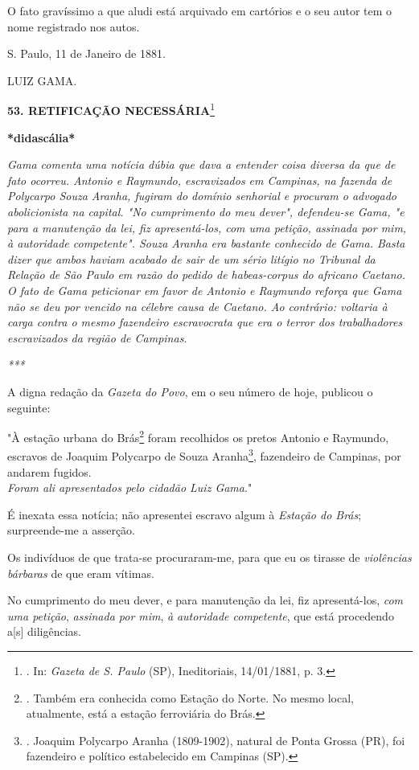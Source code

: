 O fato gravíssimo a que aludi está arquivado em cartórios e o seu autor
tem o nome registrado nos autos.

S. Paulo, 11 de Janeiro de 1881.

LUIZ GAMA.

\textbf{53. RETIFICAÇÃO NECESSÁRIA}\footnote{. In: \emph{Gazeta de S.
  Paulo} (SP), Ineditoriais, 14/01/1881, p. 3.}

\textbf{*didascália*}

\emph{Gama comenta uma notícia dúbia que dava a entender coisa diversa
da que de fato ocorreu. Antonio e Raymundo, escravizados em Campinas, na
fazenda de Polycarpo Souza Aranha, fugiram do domínio senhorial e
procuram o advogado abolicionista na capital. "No cumprimento do meu
dever", defendeu-se Gama, "e para a manutenção da lei, fiz
apresentá-los, com uma petição, assinada por mim, à autoridade
competente". Souza Aranha era bastante conhecido de Gama. Basta dizer
que ambos haviam acabado de sair de um sério litígio no Tribunal da
Relação de São Paulo em razão do pedido de habeas-corpus do africano
Caetano. O fato de Gama peticionar em favor de Antonio e Raymundo
reforça que Gama não se deu por vencido na célebre causa de Caetano. Ao
contrário: voltaria à carga contra o mesmo fazendeiro escravocrata que
era o terror dos trabalhadores escravizados da região de Campinas. }

\emph{***}

A digna redação da \emph{Gazeta do Povo}, em o seu número de hoje,
publicou o seguinte:

"À estação urbana do Brás\footnote{. Também era conhecida como Estação
  do Norte. No mesmo local, atualmente, está a estação ferroviária do
  Brás.} foram recolhidos os pretos Antonio e Raymundo, escravos de
Joaquim Polycarpo de Souza Aranha\footnote{. Joaquim Polycarpo Aranha
  (1809-1902), natural de Ponta Grossa (PR), foi fazendeiro e político
  estabelecido em Campinas (SP).}, fazendeiro de Campinas, por andarem
fugidos.\\
\emph{Foram ali apresentados pelo cidadão Luiz Gama}."

É inexata essa notícia; não apresentei escravo algum à \emph{Estação do
Brás}; surpreende-me a asserção.

Os indivíduos de que trata-se procuraram-me, para que eu os tirasse de
\emph{violências bárbaras} de que eram vítimas.

No cumprimento do meu dever, e para manutenção da lei, fiz
apresentá-los, \emph{com uma petição}, \emph{assinada por mim}, \emph{à}
\emph{autoridade competente}, que está procedendo a{[}s{]} diligências.

